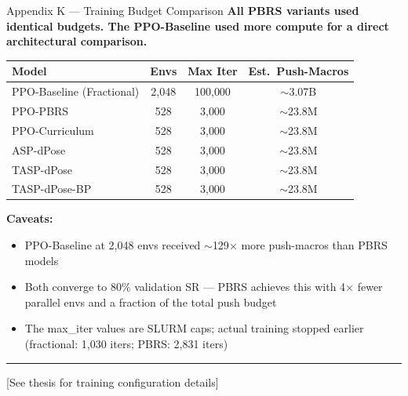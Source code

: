 \documentclass[aspectratio=169,xcolor=dvipsnames,t]{beamer}
\newcommand{\litfooter}[1]{%
  \vspace{2pt}%
  \hrule%
  \vspace{2pt}%
  {\tiny\color{LightDarkGrey} #1}%
}
\begin{document}
\begin{frame}[t]{Appendix K — Training Budget Comparison}
  \small
  \textbf{All PBRS variants used identical budgets. The PPO-Baseline used more compute for a direct architectural comparison.}

  \vspace{4pt}
  \begin{center}
  \begin{tabular}{lccc}
    \toprule
    \textbf{Model} & \textbf{Envs} & \textbf{Max Iter} & \textbf{Est.\ Push-Macros} \\
    \midrule
    PPO-Baseline (Fractional) & 2{,}048 & 100{,}000 & $\sim$3.07B \\
    PPO-PBRS & 528 & 3{,}000 & $\sim$23.8M \\
    PPO-Curriculum & 528 & 3{,}000 & $\sim$23.8M \\
    ASP-dPose & 528 & 3{,}000 & $\sim$23.8M \\
    TASP-dPose & 528 & 3{,}000 & $\sim$23.8M \\
    TASP-dPose-BP & 528 & 3{,}000 & $\sim$23.8M \\
    \bottomrule
  \end{tabular}
  \end{center}

  \vspace{4pt}
  \textbf{Caveats:}
  \begin{itemize}
    \item PPO-Baseline at 2,048 envs received $\sim$129$\times$ more push-macros than PBRS models
    \item Both converge to 80\% validation SR — PBRS achieves this with 4$\times$ fewer parallel envs and a fraction of the total push budget
    \item The max\_iter values are SLURM caps; actual training stopped earlier (fractional: 1,030 iters; PBRS: 2,831 iters)
  \end{itemize}

  \vfill\litfooter{[See thesis  for training configuration details]}
\end{frame}
\end{document}
